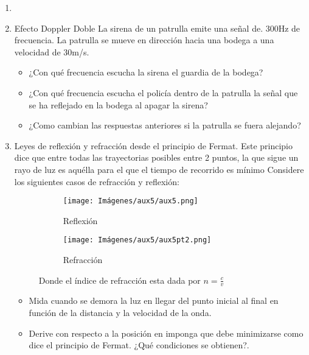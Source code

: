\documentclass[letterpaper,11pt]{article}
\begin{document}
\vspace{-1cm}
\begin{enumerate}\setlength{\itemsep}{0.4cm}


\item[]

\item Efecto Doppler Doble
La sirena de un patrulla emite una señal de. 300Hz de frecuencia. La patrulla se mueve en dirección hacia una bodega a una velocidad de 30m/s.
\begin{itemize}
    \item ¿Con qué frecuencia escucha la sirena el guardia de la bodega?
    \item ¿Con qué frecuencia escucha el policía dentro de la patrulla la señal que se ha reflejado en la bodega al apagar la sirena?
    \item ¿Como cambian las respuestas anteriores si la patrulla se fuera alejando?
\end{itemize}



\item Leyes de reflexión y refracción desde el principio de Fermat.
Este principio dice que entre todas las trayectorias
posibles entre 2 puntos, la que sigue un rayo de luz es aquélla para el que el tiempo de recorrido es mínimo
Considere los siguientes casos de refracción y reflexión:

\begin{figure}[h]
\centering
\begin{subfigure}{.5\textwidth}
  \centering
  \texttt{[image: Imágenes/aux5/aux5.png]}
  \caption{Reflexión}
  \label{fig:sub1}
\end{subfigure}%
\begin{subfigure}{.5\textwidth}
  \centering
  \texttt{[image: Imágenes/aux5/aux5pt2.png]}
  \caption{Refracción}
  \label{fig:sub2}
\end{subfigure}
\caption{Donde el índice de refracción esta dada por $n=\frac{c}{v}$}
\label{fig:test}
\end{figure}

\begin{itemize}
    \item Mida cuando se demora la luz en llegar del punto inicial al final en función de la distancia y la velocidad de la onda.
    \item Derive con respecto a la posición en imponga que debe minimizarse como dice el principio de Fermat. ¿Qué condiciones se obtienen?.
\end{itemize}



\end{enumerate}
\end{document}
